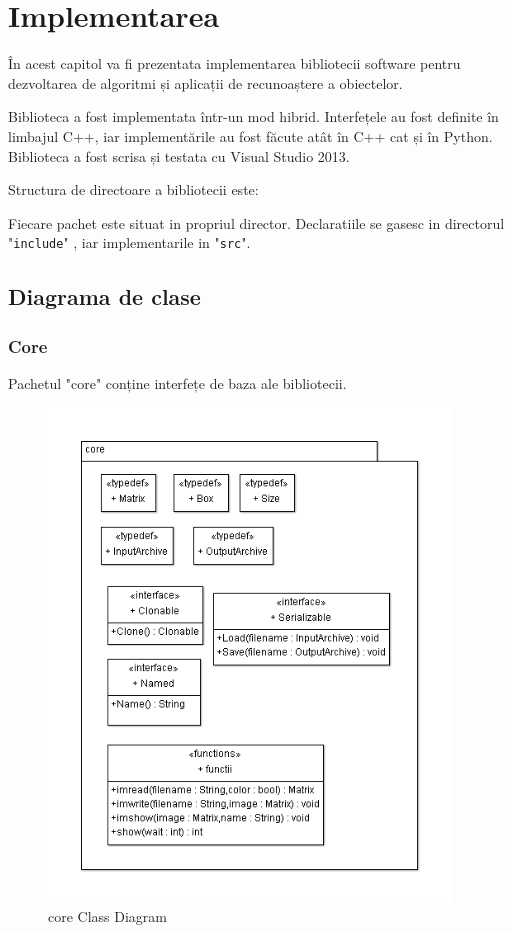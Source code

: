 \chapter{Implementarea}

În acest capitol va fi prezentata implementarea bibliotecii software pentru dezvoltarea de algoritmi și aplicații de recunoaștere a obiectelor.

Biblioteca a fost implementata într-un mod hibrid.
Interfețele au fost definite în limbajul C++, iar implementările au fost făcute atât în C++ cat și în Python.
Biblioteca a fost scrisa și testata cu Visual Studio 2013.


Structura de directoare a bibliotecii este:

Fiecare pachet este situat in propriul director.
Declaratiile se gasesc in directorul "\verb!include!"
, iar implementarile in "\verb!src!".

\pagebreak
\section{Diagrama de clase}

\subsection{Core}
Pachetul "core" conține interfețe de baza ale bibliotecii.
\begin{figure}[H]
	\centering
		\includegraphics[width=0.95\textwidth]{uml/coreClassDiagram.png}
	\caption{core Class Diagram}
	\label{fig:coreClassDiagram}
\end{figure}

